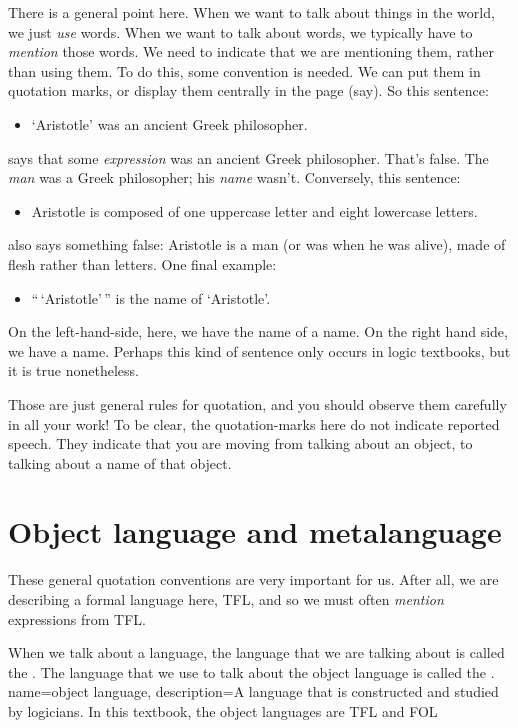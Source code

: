There is a general point here. When we want to talk about things in the world, we just \emph{use} words. When we want to talk about words, we typically have to \emph{mention} those words. We need to indicate that we are mentioning them, rather than using them. To do this, some convention is needed. We can put them in quotation marks, or display them centrally in the page (say). So this sentence:
	\begin{itemize}
		\item `Aristotle' was an ancient Greek philosopher.
	\end{itemize}
says that some \emph{expression} was an ancient Greek philosopher.
That's false. The \emph{man} was a Greek philosopher; his \emph{name} wasn't. Conversely,
this sentence:
	\begin{itemize}
		\item Aristotle is composed of one uppercase letter and eight lowercase letters.
	\end{itemize}
also says something false: Aristotle is a man (or was when he was alive), made of flesh rather than letters. One final example:
	\begin{itemize}
		\item ``\,`Aristotle'\,'' is the name of `Aristotle'.
	\end{itemize} 
On the left-hand-side, here, we have the name of a name. On the right hand side, we have a name. Perhaps this kind of sentence only occurs in logic textbooks, but it is true nonetheless.

Those are just general rules for quotation, and you should observe them carefully in all your work! To be clear, the quotation-marks here do not indicate reported speech. They indicate that you are moving from talking about an object, to talking about a name of that object.


\section{Object language and metalanguage}
These general quotation conventions are very important for us. After all, we are describing a formal language here, TFL, and so we must often \emph{mention} expressions from TFL.

When we talk about a language, the language that we are talking about is called the . The language that we use to talk about the object language is called the .
\label{def.metalanguage}
{
name=object language,
description={A language that is constructed and studied by logicians. In this textbook,
 the object languages are TFL and FOL}
}

